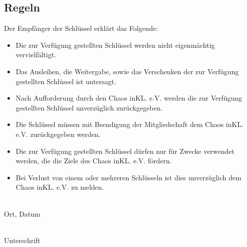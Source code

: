 \documentclass[ngerman,a4paper]{scrartcl}
\begin{document}
\begin{Form}
\section*{Regeln}
Der Empfänger der Schlüssel erklärt das Folgende:\\
\begin{itemize}
 \item Die zur Verfügung gestellten Schlüssel werden nicht eigenmächtig vervielfältigt.
 \item Das Ausleihen, die Weitergabe, sowie das Verschenken der zur Verfügung gestellten Schlüssel ist untersagt.
 \item Nach Aufforderung durch den Chaos inKL. e.V. werden die zur Verfügung gestellten Schlüssel unverzüglich zurückgegeben. 
 \item Die Schlüssel müssen mit Beendigung der Mitgliedschaft dem Chaos inKL. e.V. zurückgegeben werden.
 \item Die zur Verfügung gestellten Schlüssel dürfen nur für Zwecke verwendet werden, die die Ziele des Chaos inKL. e.V. fördern.
 \item Bei Verlust von einem oder mehreren Schlüsseln ist dies unverzüglich dem Chaos inKL. e.V. zu melden.
\end{itemize}
\vfill
\begin{minipage}{5cm}
 \dotfill\\
 Ort, Datum
\end{minipage}
\hspace{1cm}
\begin{minipage}{7cm}
 \dotfill\\
 Unterschrift
\end{minipage}
\end{Form}
\end{document}

